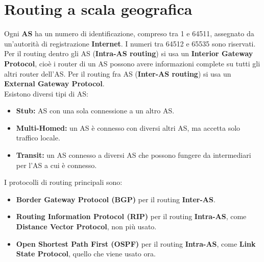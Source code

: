 \newpage
\section{Routing a scala geografica}
Ogni \textbf{AS} ha un numero di identificazione, compreso tra 1 e 64511, assegnato da un'autorità di registrazione \textbf{Internet}. I numeri tra 64512 e 65535 sono riservati.
\\
Per il routing dentro gli AS (\textbf{Intra-AS routing}) si usa un \textbf{Interior Gateway Protocol}, cioè i router di un AS possono avere informazioni complete su tutti gli altri router dell'AS.
Per il routing fra AS (\textbf{Inter-AS routing}) si usa un \textbf{External Gateway Protocol}.
\\
Esistono diversi tipi di AS:
\begin{itemize}
    \item \textbf{Stub:} AS con una sola connessione a un altro AS.
    \item \textbf{Multi-Homed:} un AS è connesso con diversi altri AS, ma accetta solo traffico locale.
    \item \textbf{Transit:} un AS connesso a diversi AS che possono fungere da intermediari per l'AS a cui è connesso.
\end{itemize}
I protocolli di routing principali sono:
\begin{itemize}
    \item \textbf{Border Gateway Protocol (BGP)} per il routing \textbf{Inter-AS}.
    \item \textbf{Routing Information Protocol (RIP)} per il routing \textbf{Intra-AS}, come \textbf{Distance Vector Protocol}, non più usato.
    \item \textbf{Open Shortest Path First (OSPF)} per il routing \textbf{Intra-AS}, come \textbf{Link State Protocol}, quello che viene usato ora.
\end{itemize}


